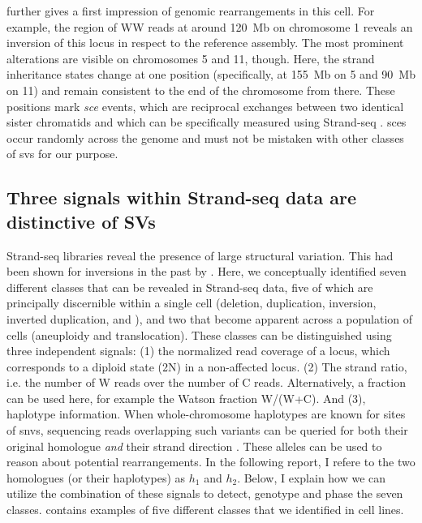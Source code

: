  further gives a first impression of genomic rearrangements
in this cell. For example, the region of WW reads at around 120~Mb on chromosome
1 reveals an inversion of this locus in respect to the reference assembly. The
most prominent alterations are visible on chromosomes 5 and 11, though. Here,
the strand inheritance states change at one position (specifically,
at 155~Mb on 5 and 90~Mb on 11) and remain consistent to
the end of the chromosome from there. These positions mark \emph{\acf{sce}} events,
which are reciprocal exchanges between two identical sister chromatids and
which can be specifically measured using Strand-seq \citep{Falconer2012}.
\Acp{sce} occur randomly across the genome and must not be mistaken with other
classes of \acp{sv} for our purpose.





\subsection{Three signals within Strand-seq data are distinctive of SVs}
\label{sec:mosaic_concept}

Strand-seq libraries reveal the presence of large structural variation. This had been shown
for inversions in the past by \citet{Sanders2016}. Here, we conceptually identified seven
different \sv classes that can be revealed in Strand-seq data, five of which are
principally discernible within a single cell (deletion, duplication, inversion,
inverted duplication, and \loh), and two that become apparent across a population
of cells (aneuploidy and translocation). These \sv classes can be distinguished
using three independent signals: (1) the normalized read coverage of a locus,
which corresponds to a diploid state (2N) in a non-affected locus.
(2) The strand ratio, i.e. the number of W reads over the number of C reads.
Alternatively, a fraction can be used here, for example the Watson fraction
W/(W+C). And (3), haplotype information. When whole-chromosome haplotypes are known
for sites of \acp{snv}, sequencing reads overlapping such variants can be queried for
both their original homologue \emph{and} their strand direction \citep{Porubsky2016}.
These alleles can be used to reason about potential rearrangements. In the
following report, I refere to the two homologues (or their haplotypes) as $h_1$
and $h_2$.
Below, I explain how we can utilize the combination of these signals to detect,
genotype and phase the seven \sv classes.  contains examples of
five different \sv classes that we identified in \rpe cell lines.

